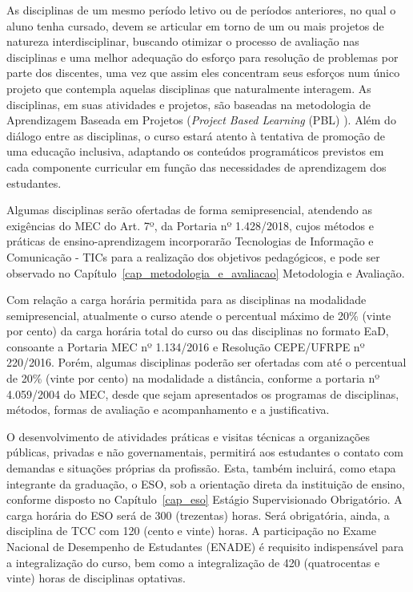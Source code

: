 \documentclass[
	12pt,				%
	openright,			%
  oneside,     %
	a4paper,			%
	chapter=TITLE,		%
	english,			%
	french,				%
	spanish,			%
	brazil				%
	]{abntex2}
\begin{document}
  As disciplinas de um mesmo período letivo ou de períodos anteriores, no qual o aluno tenha cursado, devem se articular em torno de um ou mais projetos de natureza interdisciplinar, buscando otimizar o processo de avaliação nas disciplinas e uma melhor adequação do esforço para resolução de problemas por parte dos discentes, uma vez que assim eles concentram seus esforços num único projeto que contempla aquelas disciplinas que naturalmente interagem. As disciplinas, em suas atividades e projetos, são baseadas na metodologia de Aprendizagem Baseada em Projetos (\textit{Project Based Learning} (PBL) \cite{barrows1986taxonomy}). Além do diálogo entre as disciplinas, o curso estará atento à tentativa de promoção de uma educação inclusiva, adaptando os conteúdos programáticos previstos em cada componente curricular em função das necessidades de aprendizagem dos estudantes.
  
  Algumas disciplinas serão ofertadas de forma semipresencial, atendendo as exigências do MEC do Art. 7º, da Portaria nº 1.428/2018, cujos métodos e práticas de ensino-aprendizagem incorporarão Tecnologias de Informação e Comunicação - TICs para a realização dos objetivos pedagógicos, e pode ser observado no Capítulo~\ref{cap_metodologia_e_avaliacao} Metodologia e Avaliação.
  
  Com relação a carga horária permitida para as disciplinas na modalidade semipresencial, atualmente o curso atende o percentual máximo de 20\% (vinte por cento) da carga horária total do curso ou das disciplinas no formato EaD, consoante a Portaria MEC nº 1.134/2016 e Resolução CEPE/UFRPE nº 220/2016. Porém, algumas disciplinas poderão ser ofertadas com até o percentual de 20\% (vinte por cento) na modalidade a distância, conforme a portaria nº 4.059/2004 do MEC, desde que sejam apresentados os programas de disciplinas, métodos, formas de avaliação e acompanhamento e a justificativa.
  
  O desenvolvimento de atividades práticas e visitas técnicas a organizações públicas, privadas e não governamentais, permitirá aos estudantes o contato com demandas e situações próprias da profissão. Esta, também incluirá, como etapa integrante da graduação, o ESO, sob a orientação direta da instituição de ensino, conforme disposto no Capítulo~\ref{cap_eso} Estágio Supervisionado Obrigatório. A carga horária do ESO será de 300 (trezentas) horas. Será obrigatória, ainda, a disciplina de TCC com 120 (cento e vinte) horas. A participação no Exame Nacional de Desempenho de Estudantes (ENADE) é requisito indispensável para a integralização do curso, bem como a integralização de 420 (quatrocentas e vinte) horas de disciplinas optativas.
  
\end{document}
